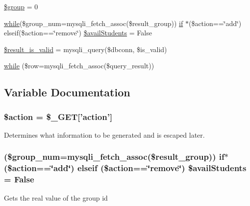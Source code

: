 \begin{DoxyCompactItemize}
\hyperlink{updateStudentTableDB_8php_ad530a85733b0ec1dc321859fd8faa0dc}{\$group} = 0
\item 
\hyperlink{studentForm_8php_abeb5d2366a9870820ffb1e260d040d8d}{while}(\$group\-\_\-num=mysqli\-\_\-fetch\-\_\-assoc(\$result\-\_\-group)) \*
\hyperlink{updateBenchDB_8php_a0c1f2915e12defa9f4d515347d884dee}{if} $\ast$(\$action==\char`\"{}add\char`\"{}) elseif(\$action==\char`\"{}remove\char`\"{}) \hyperlink{updateStudentTableDB_8php_a9c865fd17963305c27b0e1cf920f24f8}{\$avail\-Students} = \-False
\item 
\hyperlink{updateStudentTableDB_8php_a93add9cb1d213b0fdb7c51b0464785d3}{\$result\-\_\-is\-\_\-valid} = mysqli\-\_\-query(\$dbconn, \$is\-\_\-valid)
\item 
\hyperlink{updateStudentTableDB_8php_abbca5b4e0da1a7b7e95bb777ad93473d}{while} (\$row=mysqli\-\_\-fetch\-\_\-assoc(\$query\-\_\-result))
\end{DoxyCompactItemize}


\subsection{\-Variable \-Documentation}
\hypertarget{updateStudentTableDB_8php_aa698a3e72116e8e778be0e95d908ee30}{
\subsubsection[{\$action}]{\setlength{\rightskip}{0pt plus 5cm}\$action = \$\-\_\-\-G\-E\-T\mbox{[}'action'\mbox{]}}}\label{updateStudentTableDB_8php_aa698a3e72116e8e778be0e95d908ee30}
\-Determines what information to be generated and is escaped later. \hypertarget{updateStudentTableDB_8php_a9c865fd17963305c27b0e1cf920f24f8}{
\subsubsection[{\$avail\-Students}]{ (\$group\-\_\-num=mysqli\-\_\-fetch\-\_\-assoc(\$result\-\_\-group)) {\bf if}$\ast$ (\$action==\char`\"{}add\char`\"{}) elseif (\$action==\char`\"{}remove\char`\"{}) \$avail\-Students = \-False}}\label{updateStudentTableDB_8php_a9c865fd17963305c27b0e1cf920f24f8}
\-Gets the real value of the group id

